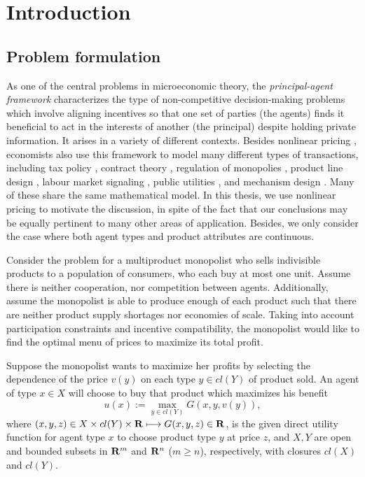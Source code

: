 \chapter{Introduction}\label{chapter: introduction}

\section{Problem formulation}

As one of the central problems in microeconomic theory, the {\em principal-agent framework} characterizes the type of non-competitive decision-making problems which involve aligning incentives so that one set of parties (the agents) finds it beneficial to act in the interests of another (the principal) despite holding private information.
It arises in a variety of different contexts. 
{ Besides nonlinear pricing \cite{Armstrong96,MussaRosen78,Spence80,Wilson93}, economists also use this framework to model many different types of transactions, including tax policy \cite{GuesnerieLaffont78,Mirrlees71,Rochet85}, contract theory \cite{QuinziiRochet85}, regulation of monopolies \cite{BaronMyerson82}, product line design \cite{RochetChone98}, labour market signaling \cite{Spence74}, public utilities \cite{Roberts79}, and mechanism design \cite{
KadanRenySwinkels11, MaskinRiley84, McAfeeMcMillan88, MonteiroPage98, Myerson81, Vohra11}. Many of these share the same mathematical model. }
In this thesis, we use nonlinear pricing to motivate the discussion,  in spite of the fact that our conclusions may be equally pertinent to many other areas of application. Besides, we only consider the case where both agent types and product attributes are continuous.\medskip

Consider the problem for a multiproduct monopolist who sells indivisible products to a population of consumers, who each buy at most one unit. Assume there is neither cooperation, nor competition between agents. Additionally, assume the monopolist is able to produce enough of each product such that there are neither product supply shortages {nor economies of scale}. Taking into account participation constraints and incentive compatibility, the monopolist would like to find the optimal menu of prices to maximize its total profit.\medskip

Suppose the monopolist wants to maximize her profits by selecting the dependence of the price $v(y)$ on each type  $y \in cl(Y)$ of product sold. An agent of type $x \in X$ will choose to buy that product which maximizes his benefit 
\begin{equation}\label{1}
u (x) := \max_{y \in cl(Y)} G(x, y, v(y)),
\end{equation}
where $(x, y, z)\in X \times cl(Y)\times {\mathbf R} \longmapsto G(x,y,z) \in {\mathbf R}$, is the given direct utility function for agent type $x$ to choose product type $y$ at price $z$, and $X,Y$ are open and bounded subsets in ${\mathbf R}^m$ and ${\mathbf R}^n$ ($m \ge n$), respectively,
with closures $cl(X)$ and $cl(Y)$.\medskip


